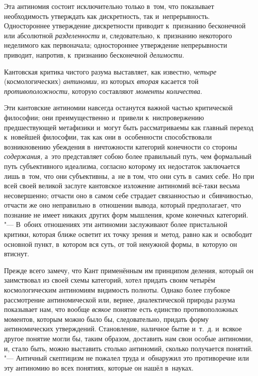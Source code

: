Эта антиномия состоит исключительно только в~том, что показывает необходимость
утверждать как дискретность, так и~непрерывность. Одностороннее утверждение
дискретности приводит к~признанию бесконечной или абсолютной
{\em разделенности} и, следовательно, к~признанию некоторого неделимого как
первоначала; одностороннее утверждение непрерывности приводит, напротив,
к~признанию бесконечной {\em делимости}.

Кантовская критика чистого разума выставляет, как известно, {\em четыре}
(космологических) {\em антиномии,} из которых {\em вторая} касается той
{\em противоположности,} которую составляют {\em моменты количества}.

Эти кантовские антиномии навсегда останутся важной частью критической
философии; они преимущественно и~привели к~ниспровержению предшествующей
метафизики и~могут быть рассматриваемы как главный переход к~новейшей
философии, так как они в~особенности способствовали возникновению убеждения
в~ничтожности категорий конечности со стороны
{\em содержания,} а~это представляет собою более
правильный путь, чем формальный путь субъективного идеализма, согласно
которому их недостаток заключается лишь в~том, что они субъективны, а~не в
том, что они суть в~самих себе. Но при всей своей великой заслуге
кантовское изложение антиномий всё-таки весьма несовершенно; отчасти оно в
самом себе страдает связанностью и~сбивчивостью, отчасти же оно неправильно
в~отношении вывода, который предполагает, что познание не имеет никаких
других форм мышления, кроме конечных категорий. "--- В~обоих отношениях эти
антиномии заслуживают более пристальной критики, которая ближе осветит их
точку зрения и~метод, равно как и~освободит основной пункт, в~котором вся
суть, от той ненужной формы, в~которую он втиснут.

Прежде всего замечу, что Кант применённым им принципом деления, который он
заимствовал из своей схемы категорий, хотел придать своим четырём
космологическим антиномиям видимость полноты. Однако более глубокое
рассмотрение антиномической или, вернее, диалектической природы разума
показывает нам, что вообще {\em всякое} понятие есть
единство противоположных моментов, которым можно было бы, следовательно,
придать форму антиномических утверждений. Становление, наличное бытие
и~т.~д. и~всякое другое понятие могли бы, таким образом, доставить нам свои
особые антиномии, и, стало быть, можно выставить столько антиномий, сколько
получается понятий. "--- Античный скептицизм не пожалел труда и~обнаружил это
противоречие или эту антиномию во всех понятиях, которые он нашёл в~науках.

